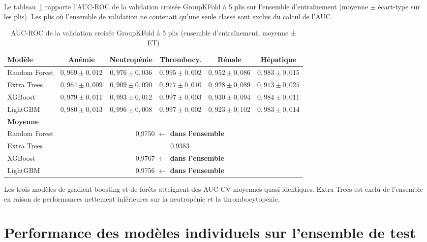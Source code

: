 \documentclass[12pt,a4paper]{report}
\begin{document}
Le tableau~\ref{tab:cv} rapporte l'AUC-ROC de la validation croisée GroupKFold à 5 plis sur l'ensemble d'entraînement (moyenne $\pm$ écart-type sur les plis). Les plis où l'ensemble de validation ne contenait qu'une seule classe sont exclus du calcul de l'AUC.

\begin{table}[H]
\centering
\caption{AUC-ROC de la validation croisée GroupKFold à 5 plis (ensemble d'entraînement, moyenne ± ET)}
\label{tab:cv}
\setlength{\tabcolsep}{4pt}
\begin{tabular}{lccccc}
\toprule
\textbf{Modèle} & \textbf{Anémie} & \textbf{Neutropénie} & \textbf{Thrombocy.} & \textbf{Rénale} & \textbf{Hépatique} \\
\midrule
Random Forest & $0{,}969 \pm 0{,}012$ & $0{,}976 \pm 0{,}036$ & $0{,}995 \pm 0{,}002$ & $0{,}952 \pm 0{,}086$ & $0{,}983 \pm 0{,}015$ \\
Extra Trees   & $0{,}964 \pm 0{,}009$ & $0{,}909 \pm 0{,}090$ & $0{,}977 \pm 0{,}010$ & $0{,}928 \pm 0{,}089$ & $0{,}913 \pm 0{,}025$ \\
XGBoost       & $0{,}979 \pm 0{,}011$ & $0{,}993 \pm 0{,}012$ & $0{,}997 \pm 0{,}003$ & $0{,}930 \pm 0{,}094$ & $0{,}984 \pm 0{,}011$ \\
LightGBM      & $0{,}980 \pm 0{,}013$ & $0{,}996 \pm 0{,}008$ & $0{,}997 \pm 0{,}002$ & $0{,}923 \pm 0{,}102$ & $0{,}983 \pm 0{,}014$ \\
\midrule
\textbf{Moyenne} & & & & & \\
Random Forest & \multicolumn{5}{c}{0,9750 $\leftarrow$ \textbf{dans l'ensemble}} \\
Extra Trees   & \multicolumn{5}{c}{0,9383} \\
XGBoost       & \multicolumn{5}{c}{0,9767 $\leftarrow$ \textbf{dans l'ensemble}} \\
LightGBM      & \multicolumn{5}{c}{0,9756 $\leftarrow$ \textbf{dans l'ensemble}} \\
\bottomrule
\end{tabular}
\end{table}

Les trois modèles de gradient boosting et de forêts atteignent des AUC CV moyennes quasi identiques. Extra Trees est exclu de l'ensemble en raison de performances nettement inférieures sur la neutropénie et la thrombocytopénie.

\section{Performance des modèles individuels sur l'ensemble de test}
\end{document}
